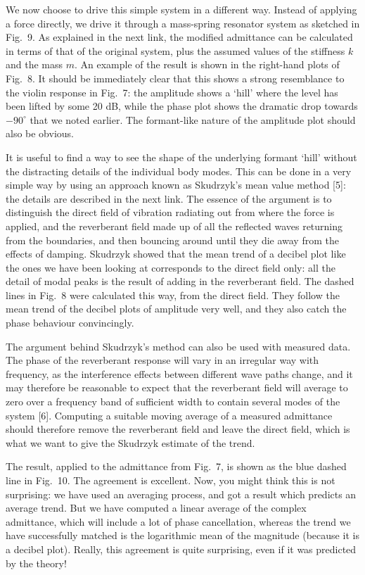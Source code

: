   We now choose to drive this simple system in a different way. Instead of 
  applying a force directly, we drive it through a mass-spring resonator system 
  as sketched in Fig.\ 9. As explained in the next link, the modified 
  admittance can be calculated in terms of that of the original system, plus 
  the assumed values of the stiffness $k$ and the mass $m$. An example of the 
  result is shown in the right-hand plots of Fig.\ 8. It should be immediately 
  clear that this shows a strong resemblance to the violin response in Fig.\ 7: 
  the amplitude shows a `hill' where the level has been lifted by some 20 dB, 
  while the phase plot shows the dramatic drop towards $-90^\circ$ that we 
  noted earlier. The formant-like nature of the amplitude plot should also be 
  obvious. 

  It is useful to find a way to see the shape of the underlying formant `hill' 
  without the distracting details of the individual body modes. This can be 
  done in a very simple way by using an approach known as Skudrzyk’s mean value 
  method [5]: the details are described in the next link. The essence of the 
  argument is to distinguish the direct field of vibration radiating out from 
  where the force is applied, and the reverberant field made up of all the 
  reflected waves returning from the boundaries, and then bouncing around until 
  they die away from the effects of damping. Skudrzyk showed that the mean 
  trend of a decibel plot like the ones we have been looking at corresponds to 
  the direct field only: all the detail of modal peaks is the result of adding 
  in the reverberant field. The dashed lines in Fig.\ 8 were calculated this 
  way, from the direct field. They follow the mean trend of the decibel plots 
  of amplitude very well, and they also catch the phase behaviour convincingly. 

  The argument behind Skudrzyk's method can also be used with measured data. 
  The phase of the reverberant response will vary in an irregular way with 
  frequency, as the interference effects between different wave paths change, 
  and it may therefore be reasonable to expect that the reverberant field will 
  average to zero over a frequency band of sufficient width to contain several 
  modes of the system [6]. Computing a suitable moving average of a measured 
  admittance should therefore remove the reverberant field and leave the direct 
  field, which is what we want to give the Skudrzyk estimate of the trend. 

  The result, applied to the admittance from Fig.\ 7, is shown as the blue 
  dashed line in Fig.\ 10. The agreement is excellent. Now, you might think 
  this is not surprising: we have used an averaging process, and got a result 
  which predicts an average trend. But we have computed a linear average of the 
  complex admittance, which will include a lot of phase cancellation, whereas 
  the trend we have successfully matched is the logarithmic mean of the 
  magnitude (because it is a decibel plot). Really, this agreement is quite 
  surprising, even if it was predicted by the theory! 

